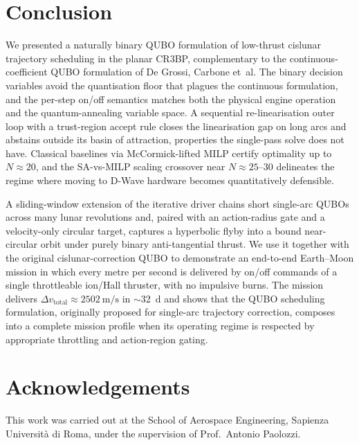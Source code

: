 \documentclass[11pt,a4paper]{article}
\theoremstyle{plain}
\begin{document}
\section{Conclusion}\label{sec:conclusion}

We presented a naturally binary QUBO formulation of low-thrust
cislunar trajectory scheduling in the planar CR3BP, complementary
to the continuous-coefficient QUBO formulation of De Grossi,
Carbone et~al. The binary decision variables avoid the
quantisation floor that plagues the continuous formulation, and
the per-step on/off semantics matches both the physical engine
operation and the quantum-annealing variable space. A
sequential re-linearisation outer loop with a trust-region
accept rule closes the linearisation gap on long arcs and
abstains outside its basin of attraction, properties the
single-pass solve does not have. Classical baselines via
McCormick-lifted MILP certify optimality up to
$N \approx 20$, and the SA-vs-MILP scaling crossover near
$N \approx 25$--$30$ delineates the regime where moving to
D-Wave hardware becomes quantitatively defensible.

A sliding-window extension of the iterative driver chains short
single-arc QUBOs across many lunar revolutions and, paired with
an action-radius gate and a velocity-only circular target,
captures a hyperbolic flyby into a bound near-circular orbit
under purely binary anti-tangential thrust. We use it together
with the original cislunar-correction QUBO to demonstrate an
end-to-end Earth--Moon mission in which every metre per second
is delivered by on/off commands of a single throttleable
ion/Hall thruster, with no impulsive burns. The mission
delivers $\Delta v_\mathrm{total} \approx
\SI{2502}{\meter\per\second}$ in $\sim$\SI{32}{\day} and shows
that the QUBO scheduling formulation, originally proposed for
single-arc trajectory correction, composes into a complete
mission profile when its operating regime is respected by
appropriate throttling and action-region gating.

\section*{Acknowledgements}
This work was carried out at the School of Aerospace Engineering,
Sapienza Universit\`a di Roma, under the supervision of Prof.\
Antonio Paolozzi.
\end{document}
